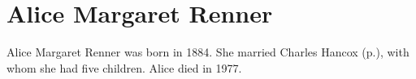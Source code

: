\section{Alice Margaret Renner}\label{Alice_Margaret_Renner}

Alice Margaret Renner was born in 1884. She married Charles Hancox (p.\pageref{Charles_Edward_Hancox}), with whom she had five children. Alice died in 1977.
